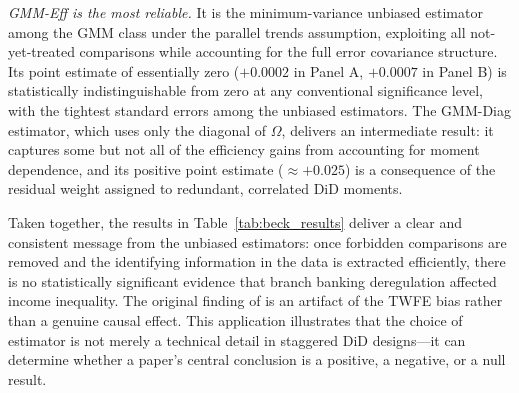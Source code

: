 \textit{GMM-Eff is the most reliable.} It is the minimum-variance
unbiased estimator among the GMM class under the parallel trends
assumption, exploiting all not-yet-treated comparisons while
accounting for the full error covariance structure. Its point
estimate of essentially zero ($+0.0002$ in Panel A, $+0.0007$ in
Panel B) is statistically indistinguishable from zero at any
conventional significance level, with the tightest standard errors
among the unbiased estimators. The GMM-Diag estimator, which uses
only the diagonal of $\Omega$, delivers an intermediate result:
it captures some but not all of the efficiency gains from accounting
for moment dependence, and its positive point estimate ($\approx +0.025$)
is a consequence of the residual weight assigned to
redundant, correlated DiD moments.

\medskip

\noindent
Taken together, the results in Table~\ref{tab:beck_results} deliver a
clear and consistent message from the unbiased estimators: once
forbidden comparisons are removed and the identifying information in
the data is extracted efficiently, there is no statistically
significant evidence that branch banking deregulation affected income
inequality. The original finding of \citet{beck2010} is an artifact
of the TWFE bias rather than a genuine causal effect. This
application illustrates that the choice of estimator is not merely a
technical detail in staggered DiD designs---it can determine whether
a paper's central conclusion is a positive, a negative, or a null
result.

